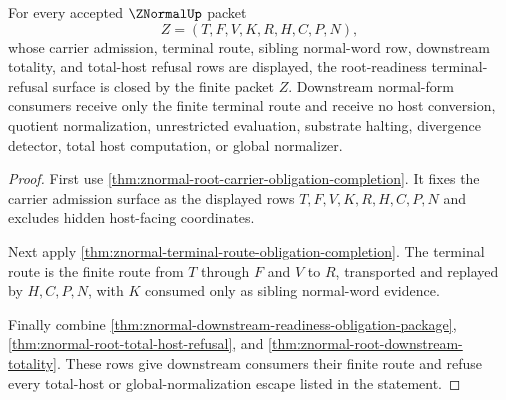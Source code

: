 \begin{theorem}
\label{thm:znormal-root-readiness-terminal-refusal-closure}
For every accepted $\ZNormalUp$ packet
$$
Z=(T,F,V,K,R,H,C,P,N),
$$
whose carrier admission, terminal route, sibling normal-word row, downstream totality, and total-host refusal rows are displayed, the root-readiness terminal-refusal surface is closed by the finite packet $Z$. Downstream normal-form consumers receive only the finite terminal route and receive no host conversion, quotient normalization, unrestricted evaluation, substrate halting, divergence detector, total host computation, or global normalizer.
\end{theorem}
\begin{proof}
First use \autoref{thm:znormal-root-carrier-obligation-completion}. It fixes the carrier admission surface as the displayed rows $T,F,V,K,R,H,C,P,N$ and excludes hidden host-facing coordinates.

Next apply \autoref{thm:znormal-terminal-route-obligation-completion}. The terminal route is the finite route from $T$ through $F$ and $V$ to $R$, transported and replayed by $H,C,P,N$, with $K$ consumed only as sibling normal-word evidence.

Finally combine \autoref{thm:znormal-downstream-readiness-obligation-package}, \autoref{thm:znormal-root-total-host-refusal}, and \autoref{thm:znormal-root-downstream-totality}. These rows give downstream consumers their finite route and refuse every total-host or global-normalization escape listed in the statement.
\end{proof}

